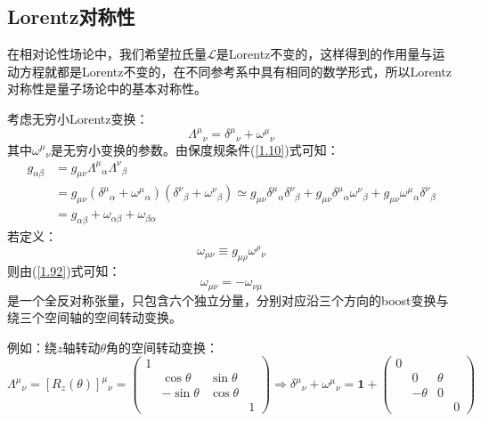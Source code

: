 \documentclass{book}
\begin{document}
\subsection{Lorentz对称性}
在相对论性场论中，我们希望拉氏量$\mathcal{L}$是Lorentz不变的，这样得到的作用量与运动方程就都是Lorentz不变的，在不同参考系中具有相同的数学形式，所以Lorentz对称性是量子场论中的基本对称性。

考虑无穷小Lorentz变换：
\begin{equation}
	\Lambda^\mu{}_\nu=\delta^\mu{}_\nu+\omega^\mu{}_\nu
\end{equation}
其中$\omega^\mu{}_\nu$是无穷小变换的参数。由保度规条件(\ref{1.10})式可知：
\begin{equation}
\begin{aligned}
g_{\alpha\beta}&=g_{\mu\nu}\Lambda^{\mu}{}_{\alpha}\Lambda^{\nu}{}_{\beta}\\&=g_{\mu\nu}(\delta^{\mu}{}_{\alpha}+\omega^{\mu}{}_{\alpha})(\delta^{\nu}{}_{\beta}+\omega^{\nu}{}_{\beta})\simeq g_{\mu\nu}\delta^{\mu}{}_{\alpha}\delta^{\nu}{}_{\beta}+g_{\mu\nu}\delta^{\mu}{}_{\alpha}\omega^{\nu}{}_{\beta}+g_{\mu\nu}\omega^{\mu}{}_{\alpha}\delta^{\nu}{}_{\beta}\\&=g_{\alpha\beta}+\omega_{\alpha\beta}+\omega_{\beta\alpha}
\end{aligned}
\label{1.92}
\end{equation}
若定义：
\begin{equation}
	\omega_{\mu\nu}\equiv g_{\mu\rho}\omega^\rho{}_\nu
\end{equation}
则由(\ref{1.92})式可知：
\begin{equation}
	\omega_{\mu\nu}=-\omega_{\nu\mu}
\end{equation}
是一个全反对称张量，只包含六个独立分量，分别对应沿三个方向的boost变换与绕三个空间轴的空间转动变换。
\begin{mdframed}[frametitle={Example}]
例如：绕$z$轴转动$\theta$角的空间转动变换：
\begin{equation}
	\Lambda^\mu{}_\nu=[R_z(\theta)]^{\mu}{}_\nu=\begin{pmatrix}1\\&\cos\theta&\sin\theta\\&-\sin\theta&\cos\theta\\&&&1\end{pmatrix}\Rightarrow \delta^\mu{}_\nu+\omega^\mu{}_\nu=\mathbf{1}+\begin{pmatrix}0\\&0&\theta\\&-\theta&0\\&&&0\end{pmatrix} 
\end{equation}
\end{mdframed}
\end{document}

